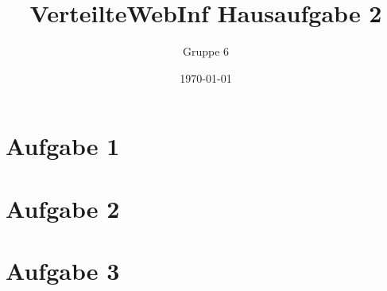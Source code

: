\documentclass[a4paper]{article}
\author{Gruppe 6}
\title{\textbf{VerteilteWebInf Hausaufgabe 2}}
\date{\today}
\begin{document}
\maketitle

\section*{Aufgabe 1}


\section*{Aufgabe 2}


\section*{Aufgabe 3}
\end{document}
